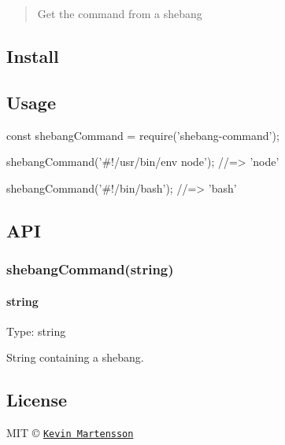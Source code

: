 \begin{quote}
Get the command from a shebang \end{quote}


\subsection*{Install}




\subsection*{Usage}


\begin{DoxyCode}
const shebangCommand = require('shebang-command');

shebangCommand('#!/usr/bin/env node');
//=> 'node'

shebangCommand('#!/bin/bash');
//=> 'bash'
\end{DoxyCode}


\subsection*{A\+PI}

\subsubsection*{shebang\+Command(string)}

\paragraph*{string}

Type\+: {\ttfamily string}

String containing a shebang.

\subsection*{License}

M\+IT © \href{http://github.com/kevva}{\tt Kevin Martensson} 